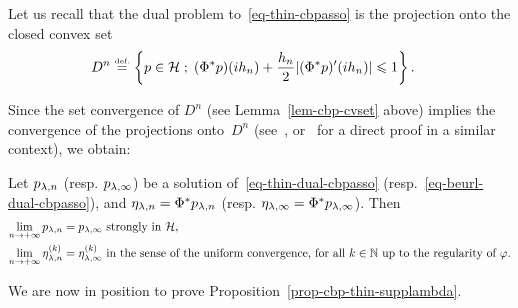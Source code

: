 Let us recall that the dual problem to~\eqref{eq-thin-cbpasso} is the projection onto the closed convex set
\begin{align*}
  D^n &\stackrel{\mbox{\upshape\tiny def.}}{=}\left\{ p\in \mathcal{H} \;;\; (\Phi^* p)(i{h_n}) + \frac{{h_n}}{2}|(\Phi^*p)'(i{h_n})|\leqslant 1 \right\}.
\end{align*}

Since the set convergence of $D^n$ (see Lemma~\ref{lem-cbp-cvset} above) implies the convergence of the projections onto~$D^n$ (see~\cite{rockafellarwets}, or~\cite{2013-duval-sparsespikes} for a direct proof in a similar context), we obtain:

\begin{lem}\label{prop-cbp-cvdual}
  Let $p_{\lambda,n}$ (resp. $p_{\lambda,\infty}$) be a solution of~\eqref{eq-thin-dual-cbpasso} (resp.~\eqref{eq-beurl-dual-cbpasso}), and $\eta_{\lambda,n}=\Phi^*p_{\lambda,n}$ (resp. $\eta_{\lambda,\infty}=\Phi^*p_{\lambda,\infty}$). Then 
  \begin{align*}
    \lim_{n\to +\infty} p_{\lambda,{n}} &=p_{\lambda,\infty} \mbox{ strongly in $\mathcal{H}$,}\\ 
    \lim_{n\to +\infty} \eta_{\lambda,n}^{(k)} &=\eta_{\lambda,\infty}^{(k)} \mbox{ in the sense of the uniform convergence, for all $k\in \mathbb{N}$ up to the regularity of $\varphi$.} 
\end{align*}
\end{lem}

We are now in position to prove Proposition~\ref{prop-cbp-thin-supplambda}.

